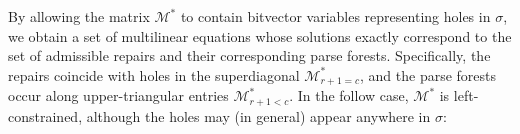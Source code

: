 \documentclass[sigplan,review,anonymous,acmsmall]{acmart}\settopmatter{printfolios=false,printccs=false,printacmref=false}
\begin{document}
\noindent By allowing the matrix $\mathcal{M}^*$ to contain bitvector variables representing holes in $\sigma$, we obtain a set of multilinear equations whose solutions exactly correspond to the set of admissible repairs and their corresponding parse forests. Specifically, the repairs coincide with holes in the superdiagonal $\mathcal{M}^*_{r+1 = c}$, and the parse forests occur along upper-triangular entries $\mathcal{M}^*_{r + 1 < c}$. In the follow case, $\mathcal{M}^*$ is left-constrained, although the holes may (in general) appear anywhere in $\sigma$:
%
%
%
\end{document}
